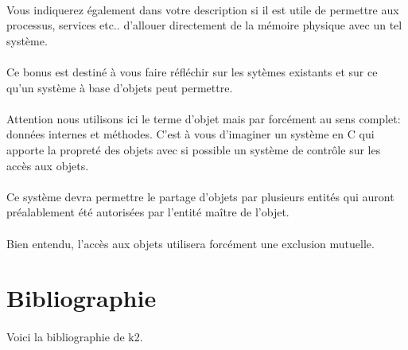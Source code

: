 \documentclass[10pt,a4wide]{article}
\begin{document}
\paragraph{}

Vous indiquerez \'egalement dans votre description si il est utile de
permettre aux processus, services etc.. d'allouer directement de la
m\'emoire physique avec un tel syst\`eme.

\paragraph{}

Ce bonus est destin\'e \`a vous faire r\'efl\'echir sur les syt\`emes
existants et sur ce qu'un syst\`eme \`a base d'objets peut permettre.

\paragraph{}

Attention nous utilisons ici le terme d'objet mais par forc\'ement au sens
complet: donn\'ees internes et m\'ethodes. C'est \`a vous d'imaginer un
syst\`eme en C qui apporte la propret\'e des objets avec si possible
un syst\`eme de contr\^ole sur les acc\`es aux objets.

\paragraph{}

Ce syst\`eme devra permettre le partage d'objets par plusieurs entit\'es
qui auront pr\'ealablement \'et\'e autoris\'ees par l'entit\'e ma\^itre de
l'objet.

\paragraph{}

Bien entendu, l'acc\`es aux objets utilisera forc\'ement une
exclusion mutuelle.

\section{Bibliographie}

\paragraph{}

Voici la bibliographie de k2.
\end{document}
